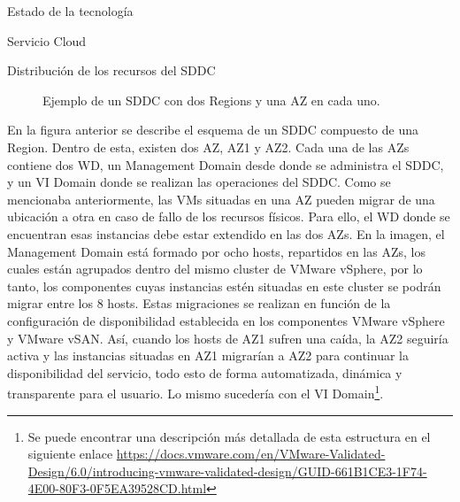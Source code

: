 \begin{chapter}{Estado de la tecnología}
\begin{section}{Servicio Cloud}
\begin{subsubsection}{Distribución de los recursos del SDDC}
\begin{figure}[h!]
          \caption{Ejemplo de un SDDC con dos Regions y una AZ en cada uno.}
          \label{fig:az-region-cluster}
        \end{figure}
        En la figura anterior se describe el esquema de un SDDC compuesto de una Region. Dentro de esta, existen dos AZ, AZ1 y AZ2. Cada una de las AZs contiene dos WD, un Management Domain desde donde se administra el SDDC, y un VI Domain donde se realizan las operaciones del SDDC. Como se mencionaba anteriormente, las VMs situadas en una AZ pueden migrar de una ubicación a otra en caso de fallo de los recursos físicos. Para ello, el WD donde se encuentran esas instancias debe estar extendido en las dos AZs. En la imagen, el Management Domain está formado por ocho hosts, repartidos en las AZs, los cuales están agrupados dentro del mismo cluster de VMware vSphere, por lo tanto, los componentes cuyas instancias estén situadas en este cluster se podrán migrar entre los 8 hosts. Estas migraciones se realizan en función de la configuración de disponibilidad establecida en los componentes VMware vSphere y VMware vSAN. Así, cuando los hosts de AZ1 sufren una caída, la AZ2 seguiría activa y las instancias situadas en AZ1 migrarían a AZ2 para continuar la disponibilidad del servicio, todo esto de forma automatizada, dinámica y transparente para el usuario. Lo mismo sucedería con el VI Domain\footnote{Se puede encontrar una descripción más detallada de esta estructura en el siguiente enlace \url{https://docs.vmware.com/en/VMware-Validated-Design/6.0/introducing-vmware-validated-design/GUID-661B1CE3-1F74-4E00-80F3-0F5EA39528CD.html}}.
        \end{subsubsection}
    

\end{section}
\end{chapter}
